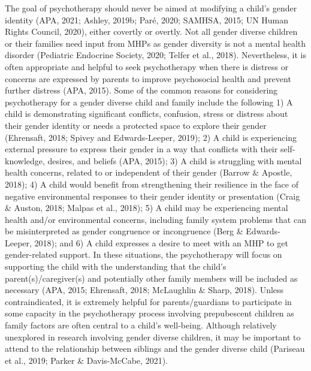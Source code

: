 \documentclass[
]{book}
\begin{document}
The goal of psychotherapy should never be aimed
at modifying a child's gender identity (APA, 2021;
Ashley, 2019b; Paré, 2020; SAMHSA, 2015; UN
Human Rights Council, 2020), either covertly or
overtly. Not all gender diverse children or their
families need input from MHPs as gender diversity
is not a mental health disorder (Pediatric Endocrine
Society, 2020; Telfer et al., 2018). Nevertheless, it is
often appropriate and helpful to seek psychotherapy
when there is distress or concerns are expressed by
parents to improve psychosocial health and prevent
further distress (APA, 2015). Some of the common
reasons for considering psychotherapy for a gender
diverse child and family include the following 1)
A child is demonstrating significant conflicts, confusion, stress or distress about their gender identity
or needs a protected space to explore their gender
(Ehrensaft, 2018; Spivey and Edwards-Leeper, 2019);
2) A child is experiencing external pressure to
express their gender in a way that conflicts with
their self-knowledge, desires, and beliefs (APA,
2015); 3) A child is struggling with mental health
concerns, related to or independent of their gender
(Barrow \& Apostle, 2018); 4) A child would benefit
from strengthening their resilience in the face of
negative environmental responses to their gender
identity or presentation (Craig \& Auston, 2018;
Malpas et al., 2018); 5) A child may be experiencing
mental health and/or environmental concerns,
including family system problems that can be misinterpreted as gender congruence or incongruence
(Berg \& Edwards-Leeper, 2018); and 6) A child
expresses a desire to meet with an MHP to get
gender-related support. In these situations, the psychotherapy will focus on supporting the child with
the understanding that the child's parent(s)/caregiver(s) and potentially other family members will
be included as necessary (APA, 2015; Ehrensaft,
2018; McLaughlin \& Sharp, 2018). Unless contraindicated, it is extremely helpful for parents/guardians to participate in some capacity in the
psychotherapy process involving prepubescent children as family factors are often central to a child's
well-being. Although relatively unexplored in
research involving gender diverse children, it may
be important to attend to the relationship between
siblings and the gender diverse child (Pariseau
et al., 2019; Parker \& Davis-McCabe, 2021).
\end{document}
